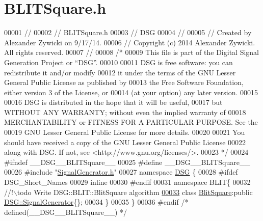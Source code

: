 \hypertarget{_b_l_i_t_square_8h_source}{\section{B\+L\+I\+T\+Square.\+h}
\label{_b_l_i_t_square_8h_source}
}

\begin{DoxyCode}
00001 \textcolor{comment}{//}
00002 \textcolor{comment}{//  BLITSquare.h}
00003 \textcolor{comment}{//  DSG}
00004 \textcolor{comment}{//}
00005 \textcolor{comment}{//  Created by Alexander Zywicki on 9/17/14.}
00006 \textcolor{comment}{//  Copyright (c) 2014 Alexander Zywicki. All rights reserved.}
00007 \textcolor{comment}{//}
00008 \textcolor{comment}{/*}
00009 \textcolor{comment}{ This file is part of the Digital Signal Generation Project or “DSG”.}
00010 \textcolor{comment}{}
00011 \textcolor{comment}{ DSG is free software: you can redistribute it and/or modify}
00012 \textcolor{comment}{ it under the terms of the GNU Lesser General Public License as published by}
00013 \textcolor{comment}{ the Free Software Foundation, either version 3 of the License, or}
00014 \textcolor{comment}{ (at your option) any later version.}
00015 \textcolor{comment}{}
00016 \textcolor{comment}{ DSG is distributed in the hope that it will be useful,}
00017 \textcolor{comment}{ but WITHOUT ANY WARRANTY; without even the implied warranty of}
00018 \textcolor{comment}{ MERCHANTABILITY or FITNESS FOR A PARTICULAR PURPOSE.  See the}
00019 \textcolor{comment}{ GNU Lesser General Public License for more details.}
00020 \textcolor{comment}{}
00021 \textcolor{comment}{ You should have received a copy of the GNU Lesser General Public License}
00022 \textcolor{comment}{ along with DSG.  If not, see <http://www.gnu.org/licenses/>.}
00023 \textcolor{comment}{ */}
00024 \textcolor{preprocessor}{#ifndef \_\_DSG\_\_BLITSquare\_\_}
00025 \textcolor{preprocessor}{#define \_\_DSG\_\_BLITSquare\_\_}
00026 \textcolor{preprocessor}{#include "\hyperlink{_signal_generator_8h}{SignalGenerator.h}"}
00027 \textcolor{keyword}{namespace }\hyperlink{namespace_d_s_g}{DSG} \{
00028 \textcolor{preprocessor}{#ifdef DSG\_Short\_Names}
00029     \textcolor{keyword}{inline}
00030 \textcolor{preprocessor}{#endif}
00031     \textcolor{keyword}{namespace }BLIT\{\textcolor{comment}{}
00032 \textcolor{comment}{        //!\(\backslash\)todo Write DSG::BLIT::BlitSquare algorithm}
\hypertarget{_b_l_i_t_square_8h_source_l00033}{}\hyperlink{class_d_s_g_1_1_b_l_i_t_1_1_blit_square}{00033} \textcolor{comment}{}        \textcolor{keyword}{class }\hyperlink{class_d_s_g_1_1_b_l_i_t_1_1_blit_square}{BlitSquare}:\textcolor{keyword}{public} \hyperlink{class_d_s_g_1_1_signal_generator}{DSG::SignalGenerator}\{\};
00034     \}
00035 \}
00036 \textcolor{preprocessor}{#endif }\textcolor{comment}{/* defined(\_\_DSG\_\_BLITSquare\_\_) */}\textcolor{preprocessor}{}
\end{DoxyCode}
